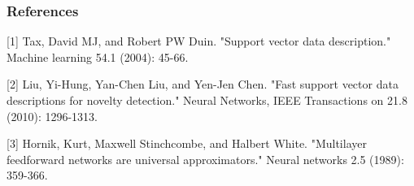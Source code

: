 \documentclass{article} %
\begin{document}









\subsubsection*{References}

\small{
[1] Tax, David MJ, and Robert PW Duin. "Support vector data description." Machine learning 54.1 (2004): 45-66. 

[2] Liu, Yi-Hung, Yan-Chen Liu, and Yen-Jen Chen. "Fast support vector data descriptions for novelty detection." Neural Networks, IEEE Transactions on 21.8 (2010): 1296-1313.

[3] Hornik, Kurt, Maxwell Stinchcombe, and Halbert White. "Multilayer feedforward networks are universal approximators." Neural networks 2.5 (1989): 359-366.
}
\end{document}
